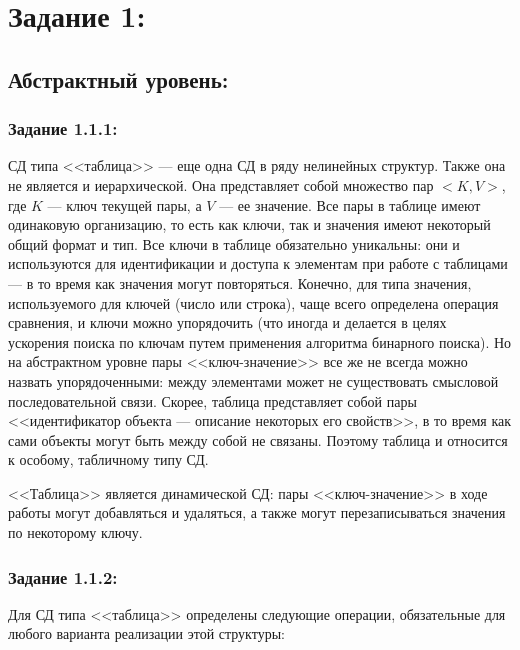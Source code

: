 \documentclass[12pt]{article}
\begin{document}
	\setcounter{secnumdepth}{-1} 
	\tableofcontents
	\newpage
	
	{\parskip=0.15cm
	
	\section{Задание 1:}
	\label{task_1}
	
	\subsection{Абстрактный уровень:}
	\label{task_1_1}
	\subsubsection{Задание 1.1.1:}
	\label{task_1_1_1}
	
	СД типа <<таблица>> --- еще одна СД в ряду нелинейных структур. Также она не является и иерархической. Она представляет собой множество пар $<K, V>$, где $K$ --- ключ текущей пары, а $V$ --- ее значение. Все пары в таблице имеют одинаковую организацию, то есть как ключи, так и значения имеют некоторый общий формат и тип. Все ключи в таблице обязательно уникальны: они и используются для идентификации и доступа к элементам при работе с таблицами --- в то время как значения могут повторяться. Конечно, для типа значения, используемого для ключей (число или строка), чаще всего определена операция сравнения, и ключи можно упорядочить (что иногда и делается в целях ускорения поиска по ключам путем применения алгоритма бинарного поиска). Но на абстрактном уровне пары <<ключ-значение>> все же не всегда можно назвать упорядоченными: между элементами может не существовать смысловой последовательной связи. Скорее, таблица представляет собой пары <<идентификатор объекта --- описание некоторых его свойств>>, в то время как сами объекты могут быть между собой не связаны. Поэтому таблица и относится к особому, табличному типу СД. 
	
	<<Таблица>> является динамической СД: пары <<ключ-значение>> в ходе работы могут добавляться и удаляться, а также могут перезаписываться значения по некоторому ключу.
	
	\subsubsection{Задание 1.1.2:}
	\label{task_1_1_2}
	Для СД типа <<таблица>> определены следующие операции, обязательные для любого варианта реализации этой структуры:
	
}
\end{document}
